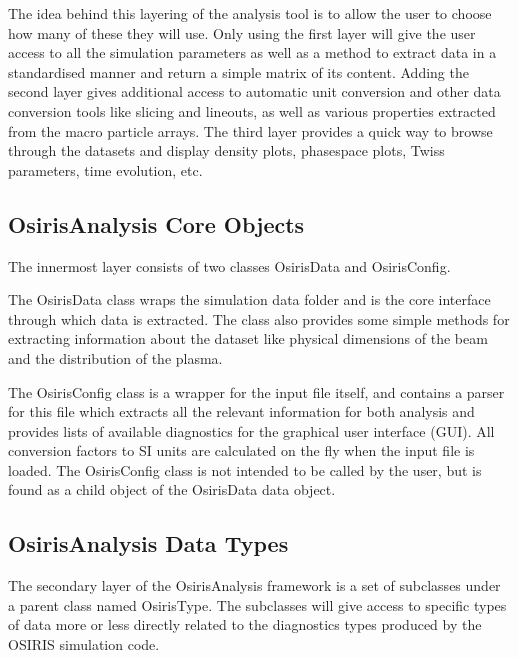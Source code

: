 The idea behind this layering of the analysis tool is to allow the user to choose how many of these they will use. Only using the first layer will give the user access to all the simulation parameters as well as a method to extract data in a standardised manner and return a simple matrix of its content. Adding the second layer gives additional access to automatic unit conversion and other data conversion tools like slicing and lineouts, as well as various properties extracted from the macro particle arrays. The third layer provides a quick way to browse through the datasets and display density plots, phasespace plots, Twiss parameters, time evolution, etc.

\subsection{OsirisAnalysis Core Objects}
\label{Tools:OALay1}

The innermost layer consists of two classes OsirisData and OsirisConfig.

The OsirisData class wraps the simulation data folder and is the core interface through which data is extracted. The class also provides some simple methods for extracting information about the dataset like physical dimensions of the beam and the distribution of the plasma.

The OsirisConfig class is a wrapper for the input file itself, and contains a parser for this file which extracts all the relevant information for both analysis and provides lists of available diagnostics for the graphical user interface (GUI). All conversion factors to SI units are calculated on the fly when the input file is loaded. The OsirisConfig class is not intended to be called by the user, but is found as a child object of the OsirisData data object.

\subsection{OsirisAnalysis Data Types}
\label{Tools:OALay2}

The secondary layer of the OsirisAnalysis framework is a set of subclasses under a parent class named OsirisType. The subclasses will give access to specific types of data more or less directly related to the diagnostics types produced by the OSIRIS simulation code.

